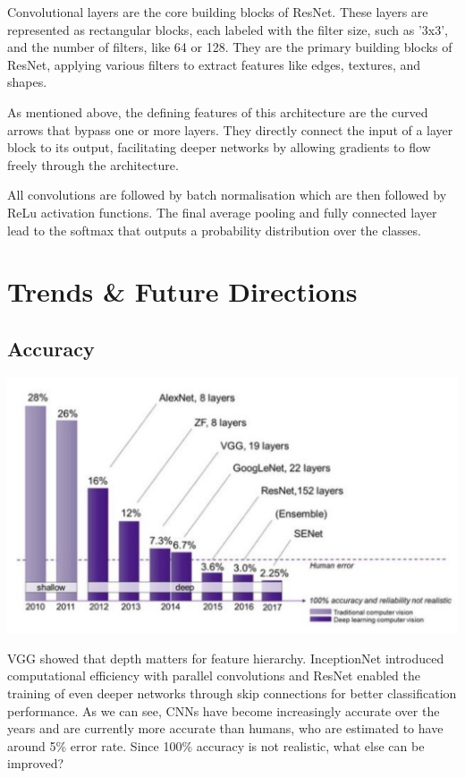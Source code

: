 \documentclass{article}
\begin{document}
        Convolutional layers are the core building blocks of ResNet. These layers are represented as rectangular blocks, each labeled with the filter size, such as '3x3', and the number of filters, like 64 or 128. They are the primary building blocks of ResNet, applying various filters to extract features like edges, textures, and shapes.

        As mentioned above, the defining features of this architecture are the curved arrows that bypass one or more layers. They directly connect the input of a layer block to its output, facilitating deeper networks by allowing gradients to flow freely through the architecture.

        All convolutions are followed by batch normalisation which are then followed by ReLu activation functions. The final average pooling and fully connected layer lead to the softmax that outputs a probability distribution over the classes.
        
\section{Trends \& Future Directions}
    \subsection{Accuracy}
    
        \begin{center}
                \includegraphics[scale=0.3]{images/accuracy.png}
        \end{center}
        
        VGG showed that depth matters for feature hierarchy. InceptionNet introduced computational efficiency with parallel convolutions and ResNet enabled the training of even deeper networks through skip connections for better classification performance. As we can see, CNNs have become increasingly accurate over the years and are currently more accurate than humans, who are estimated to have around 5\% error rate. Since 100\% accuracy is not realistic, what else can be improved?        
\end{document}
